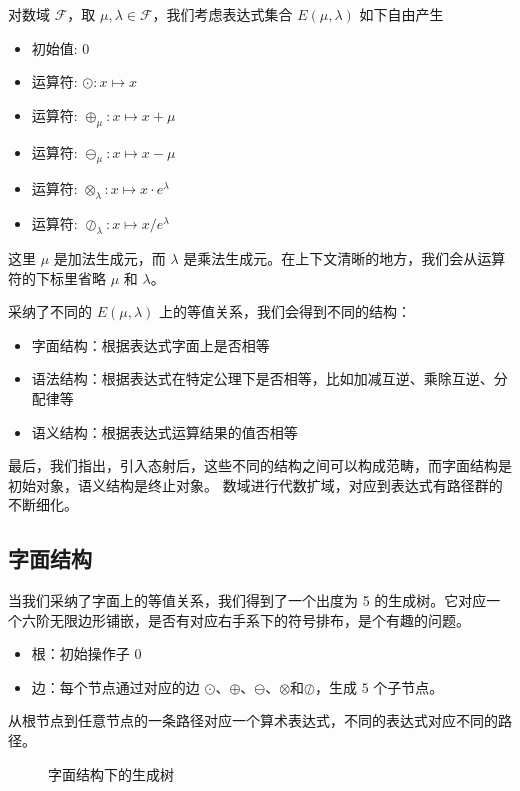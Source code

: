 \documentclass[a4paper,12pt]{article}
\numberwithin{definition}{section}
\numberwithin{lemma}{section}
\numberwithin{proposition}{section}
\numberwithin{theorem}{section}
\numberwithin{grammar}{section}
\numberwithin{program}{section}
\numberwithin{convention}{section}
\numberwithin{corollary}{section}
\begin{document}
对数域 $\mathcal{F}$，取 $\mu, \lambda \in \mathcal{F}$，我们考虑表达式集合 $E(\mu, \lambda)$ 如下自由产生
\begin{itemize}
    \item 初始值: $0$
    \item 运算符: $\odot: x \mapsto x$
    \item 运算符: $\oplus_\mu: x \mapsto x + \mu$
    \item 运算符: $\ominus_\mu: x \mapsto x - \mu$
    \item 运算符: $\otimes_\lambda: x \mapsto x \cdot e^\lambda$
    \item 运算符: $\oslash_\lambda: x \mapsto x / e^\lambda$
\end{itemize}

这里 $\mu$ 是加法生成元，而 $\lambda$ 是乘法生成元。在上下文清晰的地方，我们会从运算符的下标里省略 $\mu$ 和 $\lambda$。

采纳了不同的 $E(\mu, \lambda)$ 上的等值关系，我们会得到不同的结构：
\begin{itemize}
    \item 字面结构：根据表达式字面上是否相等
    \item 语法结构：根据表达式在特定公理下是否相等，比如加减互逆、乘除互逆、分配律等
    \item 语义结构：根据表达式运算结果的值否相等
\end{itemize}

最后，我们指出，引入态射后，这些不同的结构之间可以构成范畴，而字面结构是初始对象，语义结构是终止对象。
数域进行代数扩域，对应到表达式有路径群的不断细化。

\subsection{字面结构}\label{subsec:literial}

当我们采纳了字面上的等值关系，我们得到了一个出度为 5 的生成树。它对应一个六阶无限边形铺嵌，是否有对应右手系下的符号排布，是个有趣的问题。

\begin{itemize}
    \item 根：初始操作子 $0$
    \item 边：每个节点通过对应的边 $\odot$、$\oplus$、$\ominus$、$\otimes$和$\oslash$，生成 $5$ 个子节点。
\end{itemize}

从根节点到任意节点的一条路径对应一个算术表达式，不同的表达式对应不同的路径。

\begin{figure}[ht]
\centering
{}
\caption{字面结构下的生成树}
\end{figure}
\end{document}

